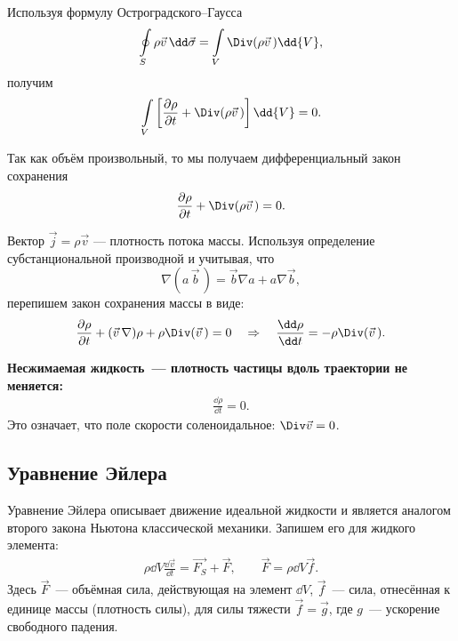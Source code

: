 Используя формулу Остроградского--Гаусса
\begin{equation}\begin{aligned}
\oint\limits_{S} \rho \vec{v}\, \dd \vec{\sigma}=\int\limits_{V} \Div (\rho \vec{v}\,)\dd{V},
\end{aligned}\end{equation}
получим
\begin{equation}\begin{aligned}
\int\limits_{V}\left[\frac{\partial \rho}{\partial t}+\Div(\rho \vec{v}\,)\right]\dd{V}=0.
\end{aligned}\end{equation}

Так как объём произвольный, то мы получаем дифференциальный закон сохранения
\begin{equation}\begin{aligned}
\frac{\partial \rho}{\partial t}+\Div(\rho \vec{v}\,)=0.
\end{aligned}\end{equation}

Вектор $ \vec{j}=\rho \vec{v} $ --- плотность потока массы. Используя определение субстанциональной производной и учитывая, что
\begin{equation}
	\nabla(a\, \vec{b}\,)=\vec{b} \nabla a +a \nabla \vec{b},
\end{equation}
перепишем закон сохранения массы в виде:
\begin{equation}\begin{aligned}
\frac{\partial \rho}{\partial t}+(\vec{v}\,\nabla) \rho+\rho \Div(\vec{v}\,)=0
\quad \Rightarrow \quad \frac{\dd \rho}{\dd t}=-\rho \Div(\vec{v}\,).
\end{aligned}\end{equation}

\textbf{Несжимаемая жидкость~--- плотность частицы вдоль траектории  не меняется:}
\begin{equation}\begin{aligned}
\frac{\dd \rho}{\dd t}=0.
\end{aligned}\end{equation}
Это означает, что поле скорости соленоидальное: $\Div\vec{v}=0$.

\subsection{Уравнение Эйлера}
Уравнение Эйлера описывает движение идеальной жидкости и является аналогом второго закона Ньютона классической механики. Запишем его для жидкого элемента:
\begin{equation}\begin{aligned}
\rho\dd{V} \frac{\dd \vec{v}}{\dd t} =\vec{F_{S}}+\vec{F}, \qquad
\vec { F } = \rho \dd{V} \vec { f }.
\end{aligned}\end{equation}
Здесь $\vec{F}$~---  объёмная сила, действующая на элемент $\dd V$\!, $\vec{f}$~--- сила, отнесённая к единице массы (плотность силы), для силы тяжести $\vec{f}=\vec{g}$, где $g$~--- ускорение свободного падения.

